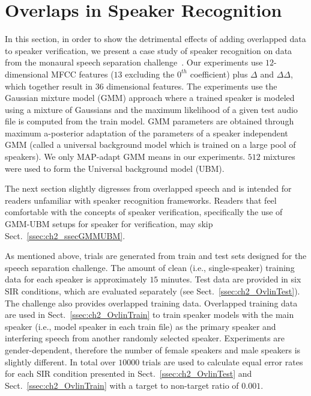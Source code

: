 \section{Overlaps in Speaker Recognition}
\label{sec:ch2_secSIDinOvl}

In this section, in order to show the detrimental effects of adding overlapped data to speaker verification, we present a case study of speaker recognition on data from the monaural speech separation challenge~\cite{cooke20101}. 
Our experiments use $12$-dimensional MFCC features ($13$ excluding the $0^{th}$ coefficient) plus $\Delta$ and $\Delta\Delta$, which together result in 36 dimensional features. 
The experiments use the Gaussian mixture model (GMM) approach where a trained speaker is modeled using a mixture of Gaussians and the maximum likelihood of a given test audio file is computed from the train model. 
GMM parameters are obtained through maximum a-posterior adaptation of the parameters of a speaker independent GMM (called a universal background model which is trained on a large pool of speakers). 
We only MAP-adapt GMM means in our experiments. 
$512$ mixtures were used to form the Universal background model (UBM). 

The next section slightly digresses from overlapped speech and is intended for readers unfamiliar with speaker recognition frameworks. 
Readers that feel comfortable with the concepts of speaker verification, specifically the use of GMM-UBM setups for speaker for verification, may skip Sect.~\ref{ssec:ch2_ssecGMMUBM}.

As mentioned above, trials are generated from train and test sets designed for the speech separation challenge. The amount of clean (i.e., single-speaker) training data for each speaker is approximately $15$ minutes. 
Test data are provided in six SIR conditions, which are evaluated separately (see Sect.~\ref{ssec:ch2_OvlinTest}). 
The challenge also provides overlapped training data. 
Overlapped training data are used in Sect.~\ref{ssec:ch2_OvlinTrain} to train speaker models with the main speaker (i.e., model speaker in each train file) as the primary speaker and interfering speech from another randomly selected speaker. 
Experiments are gender-dependent, therefore the number of female speakers and male speakers is slightly different. 
In total over $10000$ trials are used to calculate equal error rates for each SIR condition presented in Sect.~\ref{ssec:ch2_OvlinTest} and Sect.~\ref{ssec:ch2_OvlinTrain} with a target to non-target ratio of $0.001$. 


